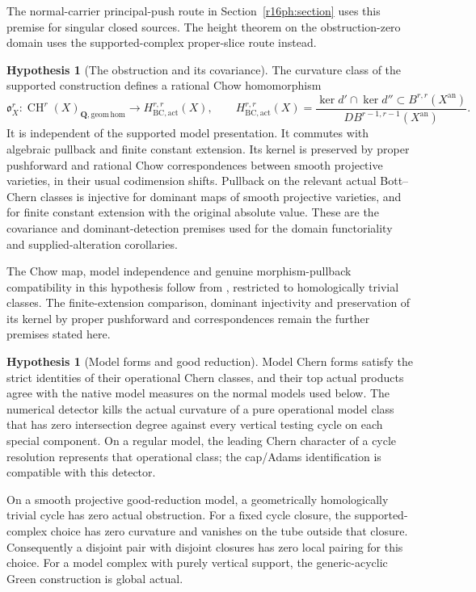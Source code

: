 \documentclass[11pt,a4paper]{article}
\theoremstyle{definition}
\newtheorem{hypothesis}[theorem]{Hypothesis}
\theoremstyle{remark}
\numberwithin{equation}{section}
\newcommand{\CH}{\operatorname{CH}}
\newcommand{\an}{\mathrm{an}}
\begin{document}
The normal-carrier principal-push route in Section~\ref{r16ph:section} uses this premise for singular closed sources. The height theorem on the obstruction-zero domain uses the supported-complex proper-slice route instead.

\begin{hypothesis}[The obstruction and its covariance]\label{hyp:height-covariance}
The curvature class of the supported construction defines a rational Chow homomorphism
\[
 \mathfrak o_X^r:\CH^r(X)_{\mathbf Q,\mathrm{geom\,hom}}
       \longrightarrow H^{r,r}_{\mathrm{BC,act}}(X),\qquad
 H^{r,r}_{\mathrm{BC,act}}(X)=
 \frac{\ker d'\cap\ker d''\subset B^{r,r}(X^{\an})}
      {D B^{r-1,r-1}(X^{\an})}.
\]
It is independent of the supported model presentation. It commutes with algebraic pullback and finite constant extension. Its kernel is preserved by proper pushforward and rational Chow correspondences between smooth projective varieties, in their usual codimension shifts. Pullback on the relevant actual Bott--Chern classes is injective for dominant maps of smooth projective varieties, and for finite constant extension with the original absolute value. These are the covariance and dominant-detection premises used for the domain functoriality and supplied-alteration corollaries.
\end{hypothesis}

The Chow map, model independence and genuine morphism-pullback compatibility in this hypothesis follow from \cite[Theorem 1.1]{ChowGreenPairs}, restricted to homologically trivial classes. The finite-extension comparison, dominant injectivity and preservation of its kernel by proper pushforward and correspondences remain the further premises stated here.

\begin{hypothesis}[Model forms and good reduction]\label{hyp:height-model}
Model Chern forms satisfy the strict identities of their operational Chern classes, and their top actual products agree with the native model measures on the normal models used below. The numerical detector kills the actual curvature of a pure operational model class that has zero intersection degree against every vertical testing cycle on each special component. On a regular model, the leading Chern character of a cycle resolution represents that operational class; the cap/Adams identification is compatible with this detector.

On a smooth projective good-reduction model, a geometrically homologically trivial cycle has zero actual obstruction. For a fixed cycle closure, the supported-complex choice has zero curvature and vanishes on the tube outside that closure. Consequently a disjoint pair with disjoint closures has zero local pairing for this choice. For a model complex with purely vertical support, the generic-acyclic Green construction is global actual.
\end{hypothesis}
\end{document}
